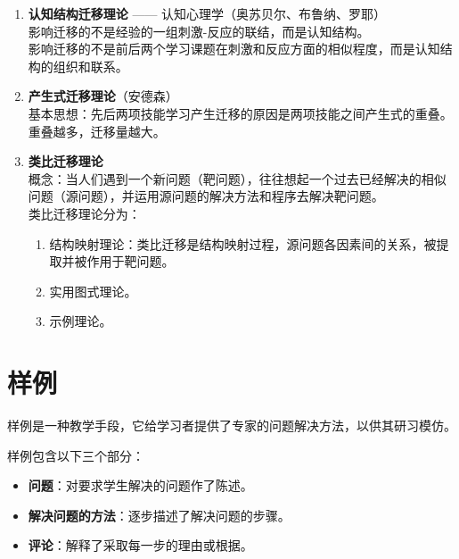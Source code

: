 \begin{enumerate}
    \item \textbf{认知结构迁移理论} —— 认知心理学（奥苏贝尔、布鲁纳、罗耶）\\
    影响迁移的不是经验的一组刺激-反应的联结，而是认知结构。\\
    影响迁移的不是前后两个学习课题在刺激和反应方面的相似程度，而是认知结构的组织和联系。
    
    \item \textbf{产生式迁移理论}（安德森）\\
    基本思想：先后两项技能学习产生迁移的原因是两项技能之间产生式的重叠。重叠越多，迁移量越大。
    
    \item \textbf{类比迁移理论}\\
    概念：当人们遇到一个新问题（靶问题），往往想起一个过去已经解决的相似问题（源问题），并运用源问题的解决方法和程序去解决靶问题。\\
    类比迁移理论分为：
    \begin{enumerate}
        \item 结构映射理论：类比迁移是结构映射过程，源问题各因素间的关系，被提取并被作用于靶问题。
        \item 实用图式理论。
        \item 示例理论。
    \end{enumerate}
\end{enumerate}


\section{样例}

样例是一种教学手段，它给学习者提供了专家的问题解决方法，以供其研习模仿。

样例包含以下三个部分：
\begin{itemize}
    \item \textbf{问题}：对要求学生解决的问题作了陈述。
    \item \textbf{解决问题的方法}：逐步描述了解决问题的步骤。
    \item \textbf{评论}：解释了采取每一步的理由或根据。
\end{itemize}
\clearpage
